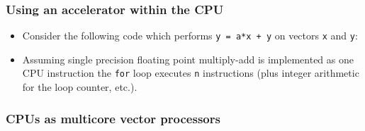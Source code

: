 \subsubsection{Using an accelerator within the
CPU}\label{using-an-accelerator-within-the-cpu}

\begin{itemize}
\itemsep1pt\parskip0pt
\item
  Consider the following code which performs \texttt{y = a*x + y} on
  vectors \texttt{x} and \texttt{y}:
\end{itemize}

\begin{Shaded}
\begin{Highlighting}[]

      
            
     \NormalTok{)}
         \NormalTok{;}

     \NormalTok{(} 

     \NormalTok{;}
\NormalTok{\}}
\end{Highlighting}
\end{Shaded}

\begin{itemize}
\itemsep1pt\parskip0pt
\item
  Assuming single precision floating point multiply-add is implemented
  as one CPU instruction the \texttt{for} loop executes \texttt{n}
  instructions (plus integer arithmetic for the loop counter, etc.).
\end{itemize}

\subsubsection{CPUs as multicore vector
processors}\label{cpus-as-multicore-vector-processors}

